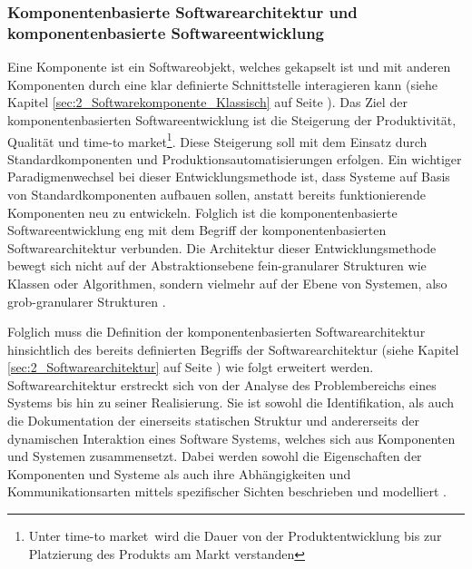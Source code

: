 \subsubsection{Komponentenbasierte Softwarearchitektur und komponentenbasierte Softwareentwicklung}
\label{sec:2_Komponentenbasierte_Softwarearchitektur}
Eine Komponente ist ein Softwareobjekt, welches gekapselt ist und mit anderen Komponenten durch eine klar definierte Schnittstelle interagieren kann (siehe Kapitel \ref{sec:2_Softwarekomponente_Klassisch} auf Seite \pageref{sec:2_Softwarekomponente_Klassisch}). Das Ziel der komponentenbasierten Softwareentwicklung ist die Steigerung der Produktivität, Qualität und \glqq time-to market\footnote{Unter \glqq time-to market\grqq\ wird die Dauer von der Produktentwicklung bis zur Platzierung des Produkts am Markt verstanden}\grqq . Diese Steigerung soll mit dem Einsatz durch Standardkomponenten und Produktionsautomatisierungen erfolgen. Ein wichtiger Paradigmenwechsel bei dieser Entwicklungsmethode ist, dass Systeme auf Basis von Standardkomponenten aufbauen sollen, anstatt bereits funktionierende Komponenten neu zu entwickeln. Folglich ist die komponentenbasierte Softwareentwicklung eng mit dem Begriff der komponentenbasierten Softwarearchitektur verbunden. Die Architektur dieser Entwicklungsmethode bewegt sich nicht auf der Abstraktionsebene fein-granularer Strukturen wie Klassen oder Algorithmen, sondern vielmehr auf der Ebene von Systemen, also grob-granularer Strukturen \citereset \autocite[siehe][S. 452-468]{Sommerville.2011}.

Folglich muss die Definition der komponentenbasierten Softwarearchitektur hinsichtlich des bereits definierten Begriffs der Softwarearchitektur (siehe Kapitel \ref{sec:2_Softwarearchitektur} auf Seite \pageref{sec:2_Softwarearchitektur}) wie folgt erweitert werden.
Softwarearchitektur erstreckt sich von der Analyse des Problembereichs eines Systems bis hin zu seiner Realisierung. Sie ist sowohl die Identifikation, als auch die Dokumentation der einerseits statischen Struktur und andererseits der dynamischen Interaktion eines Software Systems, welches sich aus Komponenten und Systemen zusammensetzt. Dabei werden sowohl die Eigenschaften der Komponenten und Systeme als auch ihre Abhängigkeiten und Kommunikationsarten mittels spezifischer Sichten beschrieben und modelliert \citereset \autocite[siehe][S. 43]{Andresen.2003}.

